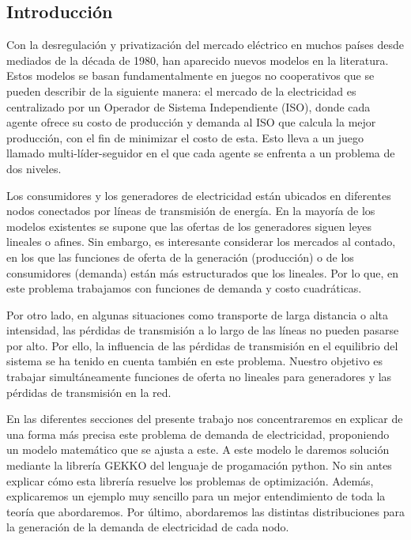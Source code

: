 \documentclass[twoside]{article}
\begin{document}
\begin{multicols}{2}



\section{Introducci\'on}

Con la desregulaci\'on y privatizaci\'on del mercado el\'ectrico en muchos pa\'ises desde mediados de la d\'ecada de 1980, han aparecido nuevos modelos en la literatura. Estos modelos se basan fundamentalmente en juegos no cooperativos que se pueden describir de la siguiente manera: el mercado de la electricidad es centralizado por un Operador de Sistema Independiente (ISO), donde cada agente ofrece su costo de producci\'on y demanda al ISO que calcula la mejor producci\'on, con el fin de minimizar el costo de esta. Esto lleva a un juego llamado multi-l\'ider-seguidor en el que cada agente se enfrenta a un problema de dos niveles. 

Los consumidores y los generadores de electricidad est\'an ubicados en diferentes nodos conectados por l\'ineas de transmisi\'on de energ\'ia. En la mayor\'ia de los modelos existentes se supone que las ofertas de los generadores siguen leyes lineales o afines. Sin embargo, es interesante considerar los mercados al contado, en los que las funciones de oferta de la generaci\'on (producci\'on) o de los consumidores (demanda) est\'an m\'as estructurados que los lineales. Por lo que, en este problema trabajamos con funciones de demanda y costo cuadr\'aticas.

Por otro lado, en algunas situaciones como transporte de larga distancia o alta intensidad, las p\'erdidas de transmisi\'on a lo largo de las l\'ineas no pueden pasarse por alto. Por ello, la influencia de las p\'erdidas de transmisi\'on en el equilibrio del sistema se ha tenido en cuenta tambi\'en en este problema. Nuestro objetivo es trabajar simult\'aneamente funciones de oferta no lineales para generadores y las p\'erdidas de transmisi\'on en la red.

En las diferentes secciones del presente trabajo nos concentraremos en explicar de una forma m\'as precisa este problema de demanda de electricidad, proponiendo un modelo matem\'atico que se ajusta a este. A este modelo le daremos soluci\'on mediante la librer\'ia \textsc{GEKKO} del lenguaje de progamaci\'on python. No sin antes explicar c\'omo esta librer\'ia resuelve los problemas de optimizaci\'on. Adem\'as, explicaremos un ejemplo muy sencillo para un mejor entendimiento de toda la teor\'ia que abordaremos. Por \'ultimo, abordaremos las distintas distribuciones para la generaci\'on de la demanda de electricidad de cada nodo.\\\\




\end{multicols}
\end{document}
